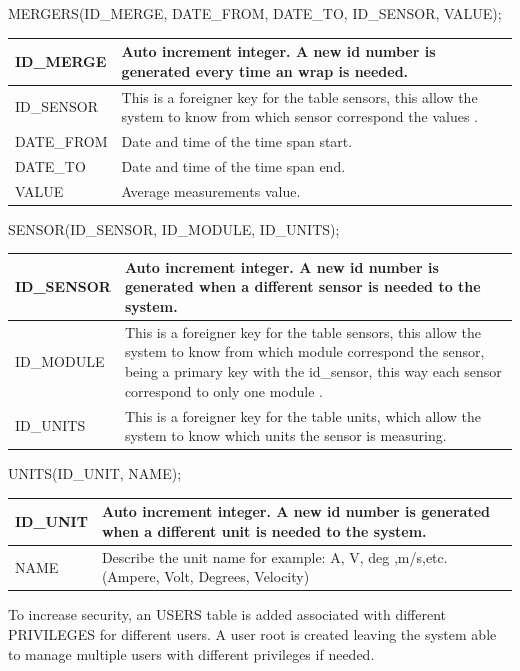 MERGERS(ID\_MERGE, DATE\_FROM, DATE\_TO, ID\_SENSOR, VALUE);

\begin{table}[H]
\centering
	\begin{tabular}{| l | p{10cm} |}
		\hline
		ID\_MERGE & Auto increment integer. A new id number is generated every time an wrap is needed. \\\hline
		ID\_SENSOR & This is a foreigner key for the table sensors, this allow the system to know from which sensor correspond the values .\\\hline
		DATE\_FROM & Date and time of the time span start. \\\hline
		DATE\_TO & Date and time of the time span end. \\\hline
		VALUE & Average measurements value. \\\hline
	\end{tabular}
\end{table}

SENSOR(ID\_SENSOR, ID\_MODULE, ID\_UNITS);

\begin{table}[H]
\centering
	\begin{tabular}{| p{2cm} | p{10cm} |}
		\hline
		ID\_SENSOR & Auto increment integer. A new id number is generated when a different sensor is needed to the system. \\\hline
		ID\_MODULE & This is a foreigner key for the table sensors, this allow the system to know from which module correspond the sensor, being a primary key with the id\_sensor, this way each sensor correspond to only one module .\\\hline
		ID\_UNITS & This is a foreigner key for the table units, which allow the system to know which units the sensor is measuring.\\\hline
	\end{tabular}
\end{table}

UNITS(ID\_UNIT, NAME);

\begin{table}[H]
\centering
	\begin{tabular}{| p{2cm} | p{10cm} |}
		\hline
		ID\_UNIT & Auto increment integer. A new id number is generated when a different unit is needed to the system. \\\hline
		NAME & Describe the unit name for example: A, V, deg ,m/s,etc. (Ampere, Volt, Degrees, Velocity)\\\hline
	\end{tabular}
\end{table}
To increase security, an USERS table is added associated with different PRIVILEGES for different users. A user root is created leaving the system able to manage multiple users with different privileges if needed.
\\

